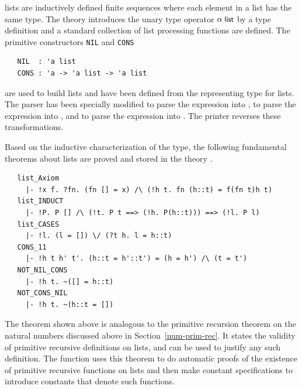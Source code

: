 \HOL{} lists are inductively defined finite sequences where each
element in a list has the same type. The theory  introduces
the unary type operator $\alpha \; \mbox{\small{\textbf{\sf{list}}}}$ by a type definition
and a standard collection of list processing functions are
defined. The primitive constructors {\small\verb+NIL+} and {\small\verb+CONS+}
%
\begin{hol}
\begin{verbatim}
   NIL  : 'a list
   CONS : 'a -> 'a list -> 'a list
\end{verbatim}
\end{hol}
%
are used to build lists and have been defined from the representing type for
lists. The \HOL{} parser
%
%
has been specially modified to parse the expression \holtxt{[]} into
, to parse the expression  into , and to parse the expression \holtxt{[$t_1$;$t_2$;\dots;$t_n$]}
into .  The \HOL{} printer
%
%
reverses these transformations.

Based on the inductive characterization of the type, the following
fundamental theorems about lists are proved and stored in the theory
.

\begin{hol}
\begin{verbatim}
   list_Axiom
     |- !x f. ?fn. (fn [] = x) /\ (!h t. fn (h::t) = f(fn t)h t)
   list_INDUCT
     |- !P. P [] /\ (!t. P t ==> (!h. P(h::t))) ==> (!l. P l)
   list_CASES
     |- !l. (l = []) \/ (?t h. l = h::t)
   CONS_11
     |- !h t h' t'. (h::t = h'::t') = (h = h') /\ (t = t')
   NOT_NIL_CONS
     |- !h t. ~([] = h::t)
   NOT_CONS_NIL
     |- !h t. ~(h::t = [])
\end{verbatim}
\end{hol}

The theorem  shown above is analogous to the primitive
recursion theorem
%
%
on the natural numbers discussed above in Section~\ref{num-prim-rec}.
It states the validity of primitive recursive definitions on lists,
and can be used to justify any such definition.  The \ML{} function
 uses this theorem to do
automatic
%
%
proofs of the existence of primitive recursive functions on lists and
then make constant specifications to introduce constants that denote
such functions.

